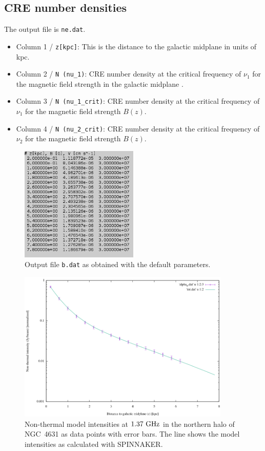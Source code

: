 \documentclass[11pt,twocolumn,a4paper]{article}
\newcommand\spix{{\small SPINNAKER}}
\begin{document}
\subsection{CRE number densities}
The output file is {\tt ne.dat}.
\begin{itemize}
\item Column 1 / {\tt z[kpc]}: This is the distance to the galactic midplane in units of kpc.
\item Column 2 / {\tt N (nu\_1)}: CRE number density at the critical frequency of $\nu_1$ for the magnetic field strength in the galactic midplane .
\item Column 3 / {\tt N (nu\_1\_crit)}: CRE number density at the critical frequency of $\nu_1$ for the magnetic field strength $B(z)$.
\item Column 4 / {\tt N (nu\_2\_crit)}: CRE number density at the critical frequency of $\nu_2$ for the magnetic field strength $B(z)$.
\end{itemize}

\begin{figure}
  \centering
  \includegraphics[width=0.5\textwidth]{b}
  \caption{Output file {\tt b.dat} as obtained with the default parameters.}
\label{fig:b}
\end{figure}


\begin{figure}
  \centering
  \includegraphics[width=0.9\textwidth]{intensity_profile}
  \caption{Non-thermal model intensities at $1.37~\rm GHz$ in the northern halo of NGC~4631 as data points with error bars. The line shows the model intensities as calculated with \spix.}
\label{fig:intensity_profile}
\end{figure}
\end{document}
